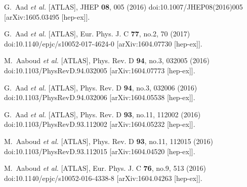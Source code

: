 \begin{thebibliography}{9}
G.~Aad \textit{et al.} [ATLAS],
JHEP \textbf{08}, 005 (2016)
doi:10.1007/JHEP08(2016)005
[arXiv:1605.03495 [hep-ex]].

G.~Aad \textit{et al.} [ATLAS],
Eur. Phys. J. C \textbf{77}, no.2, 70 (2017)
doi:10.1140/epjc/s10052-017-4624-0
[arXiv:1604.07730 [hep-ex]].

M.~Aaboud \textit{et al.} [ATLAS],
Phys. Rev. D \textbf{94}, no.3, 032005 (2016)
doi:10.1103/PhysRevD.94.032005
[arXiv:1604.07773 [hep-ex]].

G.~Aad \textit{et al.} [ATLAS],
Phys. Rev. D \textbf{94}, no.3, 032006 (2016)
doi:10.1103/PhysRevD.94.032006
[arXiv:1604.05538 [hep-ex]].

G.~Aad \textit{et al.} [ATLAS],
Phys. Rev. D \textbf{93}, no.11, 112002 (2016)
doi:10.1103/PhysRevD.93.112002
[arXiv:1604.05232 [hep-ex]].

M.~Aaboud \textit{et al.} [ATLAS],
Phys. Rev. D \textbf{93}, no.11, 112015 (2016)
doi:10.1103/PhysRevD.93.112015
[arXiv:1604.04520 [hep-ex]].

M.~Aaboud \textit{et al.} [ATLAS],
Eur. Phys. J. C \textbf{76}, no.9, 513 (2016)
doi:10.1140/epjc/s10052-016-4338-8
[arXiv:1604.04263 [hep-ex]].


\end{thebibliography}

